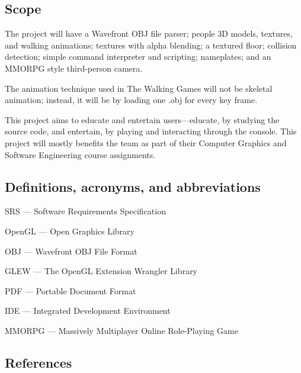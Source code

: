 \documentclass[12pt]{article}
\begin{document}
	\subsection{Scope}
	The project will have a Wavefront OBJ file parser; people 3D models, textures, and walking animations; textures with alpha blending; a textured floor; collision detection; simple command interpreter and scripting; nameplates; and an MMORPG style third-person camera. 
	
	The animation technique used in The Walking Games will not be skeletal animation; instead, it will be by loading one .obj for every key frame.
	
	This project aims to educate and entertain users---educate, by studying the source code, and entertain, by playing and interacting through the console. This project will mostly benefits the team as part of their Computer Graphics and Software Engineering course assignments.
	
	\subsection{Definitions, acronyms, and abbreviations}
	\vspace{0.1in}\noindent SRS --- Software Requirements Specification
	
	\vspace{0.1in}\noindent OpenGL --- Open Graphics Library
	
	\vspace{0.1in}\noindent OBJ --- Wavefront OBJ File Format
	
	\vspace{0.1in}\noindent GLEW --- The OpenGL Extension Wrangler Library 
	
	\vspace{0.1in}\noindent PDF --- Portable Document Format
	
	\vspace{0.1in}\noindent IDE --- Integrated Development Environment
	
	\vspace{0.1in}\noindent MMORPG --- Massively Multiplayer Online Role-Playing Game
	
	\nocite{*}
	
	\begingroup
	\subsection{References}
	\renewcommand{\section}[2]{}%
	
	
	\endgroup
	
\end{document}
